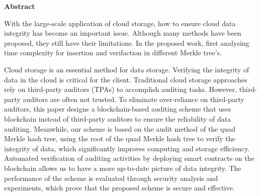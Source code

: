 \begin{center}
    \Large\textbf{Abstract}
    
\end{center}
\large
With the large-scale application of cloud storage, how to ensure cloud data integrity has become an important issue. Although many methods have been proposed, they still have their limitations.
In the proposed work, first analysing time complexity for insertion and verifaction in different Merkle tree's.

Cloud storage is an essential method for data storage. Verifying the integrity of data in the 
cloud is critical for the client. Traditional cloud storage approaches rely on third-party auditors (TPAs) to 
accomplish auditing tasks. However, third-party auditors are often not trusted. To eliminate over-reliance on 
third-party auditors, this paper designs a blockchain-based auditing scheme that uses blockchain instead of 
third-party auditors to ensure the reliability of data auditing. Meanwhile, our scheme is based on the audit 
method of the quad Merkle hash tree, using the root of the quad Merkle hash tree to verify the integrity of 
data, which significantly improves computing and storage efficiency. Automated verification of auditing 
activities by deploying smart contracts on the blockchain allows us to have a more up-to-date picture of data 
integrity. The performance of the scheme is evaluated through security analysis and experiments, which prove 
that the proposed scheme is secure and effective.
\noindent 